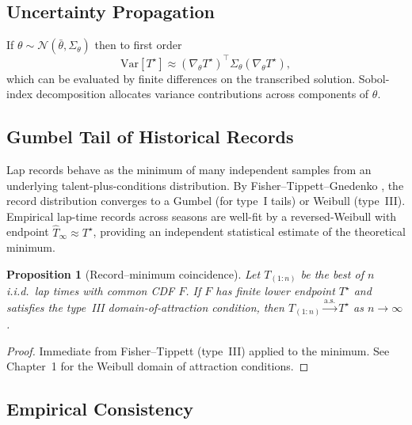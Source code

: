 \documentclass[11pt,twocolumn]{article}
\newtheorem{proposition}[theorem]{Proposition}
\theoremstyle{definition}
\theoremstyle{remark}
\newcommand{\Var}{\mathrm{Var}}
\begin{document}
\subsection{Uncertainty Propagation}

If $\theta \sim \mathcal{N}(\bar\theta, \Sigma_\theta)$ then to first order
\begin{equation}
\Var[T^{\star}] \approx (\nabla_\theta T^{\star})^{\top} \Sigma_\theta (\nabla_\theta T^{\star}),
\end{equation}
which can be evaluated by finite differences on the transcribed solution. Sobol-index decomposition \cite{sobol1993sensitivity,saltelli2008global} allocates variance contributions across components of $\theta$.

\subsection{Gumbel Tail of Historical Records}

Lap records behave as the minimum of many independent samples from an underlying talent-plus-conditions distribution. By Fisher--Tippett--Gnedenko \cite{gumbel1958statistics,fisher1928limiting,coles2001introduction,dehaan2006extreme,embrechts1997modelling}, the record distribution converges to a Gumbel (for type~I tails) or Weibull (type~III). Empirical lap-time records across seasons are well-fit by a reversed-Weibull with endpoint $\hat T_\infty \approx T^{\star}$, providing an independent statistical estimate of the theoretical minimum.

\begin{proposition}[Record--minimum coincidence]\label{prop:record}
Let $T_{(1:n)}$ be the best of $n$ i.i.d.\ lap times with common CDF $F$. If $F$ has finite lower endpoint $T^{\star}$ and satisfies the type~III domain-of-attraction condition, then $T_{(1:n)} \xrightarrow{\mathrm{a.s.}} T^{\star}$ as $n \to \infty$.
\end{proposition}

\begin{proof}
Immediate from Fisher--Tippett (type~III) applied to the minimum. See \cite{dehaan2006extreme} Chapter~1 for the Weibull domain of attraction conditions.
\end{proof}

\subsection{Empirical Consistency}
\end{document}
